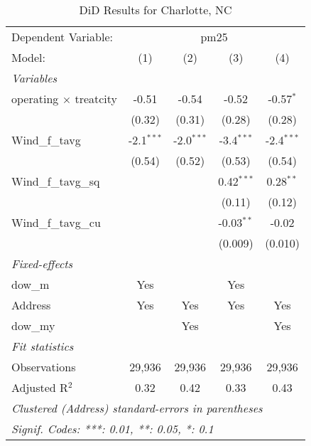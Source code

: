 
\begin{table}[htbp]
   \caption{DiD Results for Charlotte, NC}
   \centering
   \begin{tabular}{lcccc}
      \tabularnewline \midrule \midrule
      Dependent Variable: & \multicolumn{4}{c}{pm25}\\
      Model:                        & (1)          & (2)          & (3)          & (4)\\  
      \midrule
      \emph{Variables}\\
      operating $\times$ treatcity  & -0.51        & -0.54        & -0.52        & -0.57$^{*}$\\   
                                    & (0.32)       & (0.31)       & (0.28)       & (0.28)\\   
      Wind\_f\_tavg                 & -2.1$^{***}$ & -2.0$^{***}$ & -3.4$^{***}$ & -2.4$^{***}$\\   
                                    & (0.54)       & (0.52)       & (0.53)       & (0.54)\\   
      Wind\_f\_tavg\_sq             &              &              & 0.42$^{***}$ & 0.28$^{**}$\\   
                                    &              &              & (0.11)       & (0.12)\\   
      Wind\_f\_tavg\_cu             &              &              & -0.03$^{**}$ & -0.02\\   
                                    &              &              & (0.009)      & (0.010)\\   
      \midrule
      \emph{Fixed-effects}\\
      dow\_m                        & Yes          &              & Yes          & \\  
      Address                       & Yes          & Yes          & Yes          & Yes\\  
      dow\_my                       &              & Yes          &              & Yes\\  
      \midrule
      \emph{Fit statistics}\\
      Observations                  & 29,936       & 29,936       & 29,936       & 29,936\\  
      Adjusted R$^2$                & 0.32         & 0.42         & 0.33         & 0.43\\  
      \midrule \midrule
      \multicolumn{5}{l}{\emph{Clustered (Address) standard-errors in parentheses}}\\
      \multicolumn{5}{l}{\emph{Signif. Codes: ***: 0.01, **: 0.05, *: 0.1}}\\
   \end{tabular}
\end{table}


